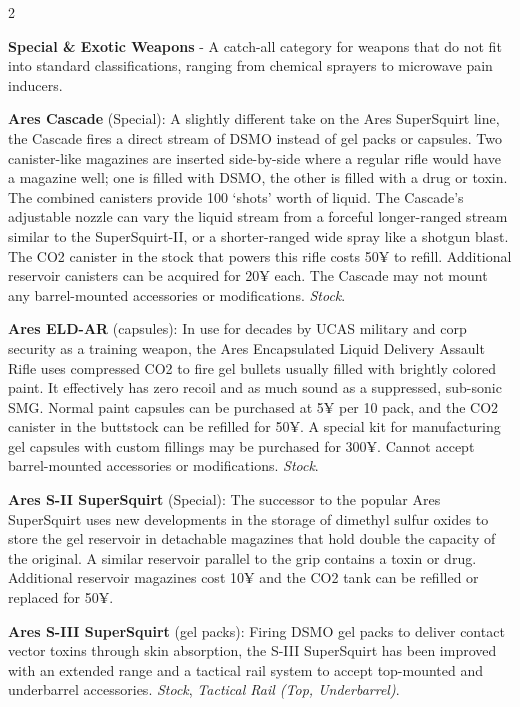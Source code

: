 \documentclass[
  oneside]{article}
\begin{document}
\begin{multicols}{2}

\textbf{Special \& Exotic Weapons} - A catch-all
category for weapons that do not fit into standard
classifications, ranging from chemical sprayers to
microwave pain inducers.

\textbf{Ares Cascade} (Special): A slightly
different take on the Ares SuperSquirt line, the
Cascade fires a direct stream of DSMO instead of
gel packs or capsules. Two canister-like magazines
are inserted side-by-side where a regular rifle
would have a magazine well; one is filled with
DSMO, the other is filled with a drug or toxin.
The combined canisters provide 100 `shots' worth
of liquid. The Cascade's adjustable nozzle can
vary the liquid stream from a forceful
longer-ranged stream similar to the
SuperSquirt-II, or a shorter-ranged wide spray
like a shotgun blast. The CO2 canister in the
stock that powers this rifle costs 50¥ to refill.
Additional reservoir canisters can be acquired for
20¥ each. The Cascade may not mount any
barrel-mounted accessories or modifications.
\emph{Stock}.

\textbf{Ares ELD-AR} (capsules): In use for
decades by UCAS military and corp security as a
training weapon, the Ares Encapsulated Liquid
Delivery Assault Rifle uses compressed CO2 to fire
gel bullets usually filled with brightly colored
paint. It effectively has zero recoil and as much
sound as a suppressed, sub-sonic SMG. Normal paint
capsules can be purchased at 5¥ per 10 pack, and
the CO2 canister in the buttstock can be refilled
for 50¥. A special kit for manufacturing gel
capsules with custom fillings may be purchased for
300¥. Cannot accept barrel-mounted accessories or
modifications. \emph{Stock}.

\textbf{Ares S-II SuperSquirt} (Special): The
successor to the popular Ares SuperSquirt uses new
developments in the storage of dimethyl sulfur
oxides to store the gel reservoir in detachable
magazines that hold double the capacity of the
original. A similar reservoir parallel to the grip
contains a toxin or drug. Additional reservoir
magazines cost 10¥ and the CO2 tank can be
refilled or replaced for 50¥.

\textbf{Ares S-III SuperSquirt} (gel packs):
Firing DSMO gel packs to deliver contact vector
toxins through skin absorption, the S-III
SuperSquirt has been improved with an extended
range and a tactical rail system to accept
top-mounted and underbarrel accessories.
\emph{Stock}, \emph{Tactical Rail (Top,
Underbarrel)}.


\end{multicols}
\end{document}
